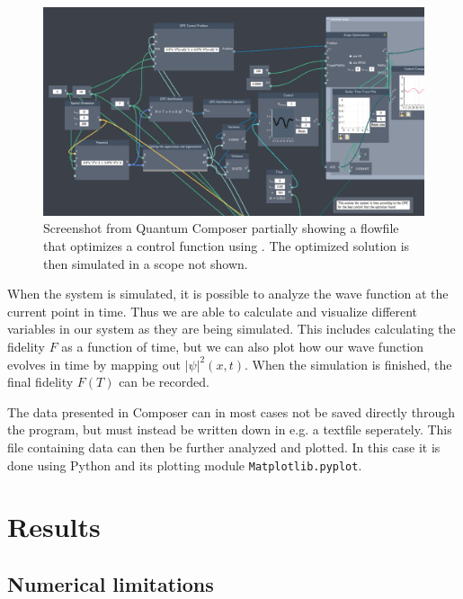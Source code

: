 \documentclass[a4paper, twocolumn]{revtex4-1}
\begin{document}
\begin{figure}
	\centering
	\includegraphics[width=\textwidth]{graphics/composerScreens/composerWide.png}
	\caption{Screenshot from Quantum Composer partially showing a flowfile that optimizes a control function using . The optimized solution is then simulated in a scope not shown.}
	\label{fig:composerScreens}
\end{figure}

When the system is simulated, it is possible to analyze the wave function at the current point in time. Thus we are able to calculate and visualize different variables in our system as they are being simulated. This includes calculating the fidelity $F$ as a function of time, but we can also plot how our wave function evolves in time by mapping out $|\psi|^2(x,t)$. When the simulation is finished, the final fidelity $F(T)$ can be recorded.


The data presented in Composer can in most cases not be saved directly through the program, but must instead be written down in e.g. a textfile seperately. This file containing data can then be further analyzed and plotted. In this case it is done using Python and its plotting module \texttt{Matplotlib.pyplot}.


\section{Results}\label{sec:results}
\subsection{\label{subsec:numericalLimitations} Numerical limitations}
\end{document}
